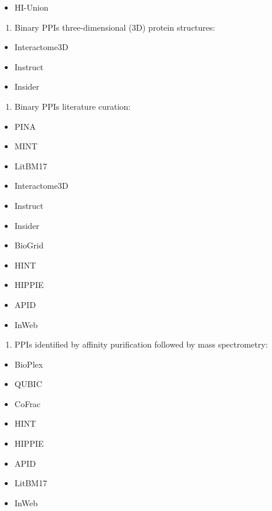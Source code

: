 \documentclass[
]{book}
\providecommand{\tightlist}{%
  \setlength{\itemsep}{0pt}\setlength{\parskip}{0pt}}
\begin{document}
\begin{itemize}
\tightlist
\item
  HI-Union \citep{Luck2020}
\end{itemize}

\begin{enumerate}
\def\labelenumi{\arabic{enumi}.}
\setcounter{enumi}{1}
\tightlist
\item
  Binary PPIs three-dimensional (3D) protein structures:
\end{enumerate}

\begin{itemize}
\tightlist
\item
  Interactome3D \citep{Mosca2013}
\item
  Instruct \citep{Meyer2013}
\item
  Insider \citep{Meyer2018}
\end{itemize}

\begin{enumerate}
\def\labelenumi{\arabic{enumi}.}
\setcounter{enumi}{2}
\tightlist
\item
  Binary PPIs literature curation:
\end{enumerate}

\begin{itemize}
\tightlist
\item
  PINA \citep{Cowley2012}
\item
  MINT \citep{Licata2012}
\item
  LitBM17 \citep{Luck2020}
\item
  Interactome3D
\item
  Instruct
\item
  Insider
\item
  BioGrid \citep{Chatr-Aryamontri2017}
\item
  HINT \citep{Das2012}
\item
  HIPPIE \citep{Alanis-Lobato2017}
\item
  APID \citep{Alonso-Lopez2019a}
\item
  InWeb \citep{li2016}
\end{itemize}

\begin{enumerate}
\def\labelenumi{\arabic{enumi}.}
\setcounter{enumi}{3}
\tightlist
\item
  PPIs identified by affinity purification followed by mass spectrometry:
\end{enumerate}

\begin{itemize}
\tightlist
\item
  BioPlex \citep{Huttlin2017}
\item
  QUBIC \citep{Hein2015}
\item
  CoFrac \citep{wan2015}
\item
  HINT
\item
  HIPPIE
\item
  APID
\item
  LitBM17
\item
  InWeb
\end{itemize}
\end{document}
